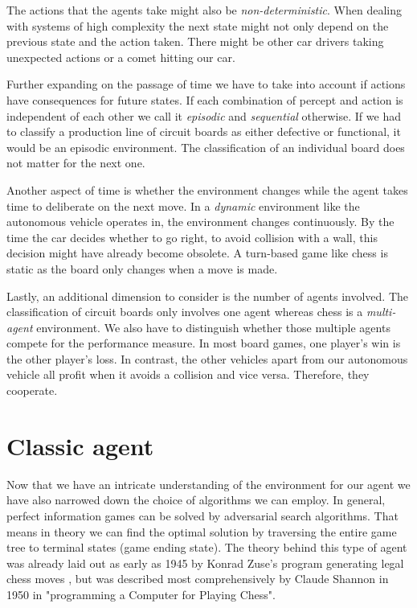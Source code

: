 The actions that the agents take might also be \textit{non-deterministic}. When dealing with systems of high complexity the next state might not only depend on the previous state and the action taken. There might be other car drivers taking unexpected actions or a comet hitting our car.

Further expanding on the passage of time we have to take into account if actions have consequences for future states. If each combination of percept and action is independent of each other we call it \textit{episodic} and \textit{sequential} otherwise. If we had to classify a production line of circuit boards as either defective or functional, it would be an episodic environment. The classification of an individual board does not matter for the next one.

Another aspect of time is whether the environment changes while the agent takes time to deliberate on the next move. In a \textit{dynamic} environment like the autonomous vehicle operates in, the environment changes continuously. By the time the car decides whether to go right, to avoid collision with a wall, this decision might have already become obsolete. A  turn-based game like chess is static as the board only changes when a move is made.

Lastly, an additional dimension to consider is the number of agents involved. The classification of circuit boards only involves one agent whereas chess is a \textit{multi-agent} environment. We also have to distinguish whether those multiple agents compete for the performance measure. In most board games, one player's win is the other player's loss. In contrast, the other vehicles apart from our autonomous vehicle all profit when it avoids a collision and vice versa. Therefore, they cooperate.



\section{Classic agent}
Now that we have an intricate understanding of the environment for our agent we have also narrowed down the choice of algorithms we can employ. In general, perfect information games can be solved by adversarial search algorithms. That means in theory we can find the optimal solution by traversing the entire game tree to terminal states (game ending state). The theory behind this type of agent was already laid out as early as 1945 by Konrad Zuse's program generating legal chess moves \cite{knuth_early_1980}, but was described most comprehensively by Claude Shannon in 1950 in "programming a Computer for Playing Chess". \cite{shannon_xxii_1950}

